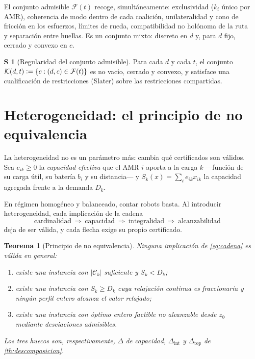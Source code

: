 \documentclass[11pt,a4paper]{article}
\theoremstyle{plain}
\newtheorem{teorema}{Teorema}[section]
\theoremstyle{definition}
\newtheorem{supuesto}{S}
\theoremstyle{remark}
\newcommand{\Fcal}{\mathcal{F}}
\newcommand{\Ccal}{\mathcal{C}}
\newcommand{\Kcal}{\mathcal{K}}
\newcommand{\defeq}{\vcentcolon=}
\begin{document}
El conjunto admisible $\Fcal(t)$ recoge, simultáneamente: exclusividad
($k_i$ único por AMR), coherencia de modo dentro de cada coalición,
unilateralidad y cono de fricción en los esfuerzos, límites de rueda,
compatibilidad no holónoma de la ruta y separación entre huellas. Es un
conjunto mixto: discreto en $d$ y, para $d$ fijo, cerrado y convexo en $c$.

\begin{supuesto}[Regularidad del conjunto admisible]
\label{s:admisible}
Para cada $d$ y cada $t$, el conjunto $\Kcal(d,t)\defeq\{c:(d,c)\in\Fcal(t)\}$
es no vacío, cerrado y convexo, y satisface una cualificación de restricciones
(Slater) sobre las restricciones compartidas.
\end{supuesto}






\section{Heterogeneidad: el principio de no equivalencia}
\label{sec:heterogeneidad}

La heterogeneidad no es un parámetro más: cambia qué certificados son válidos.
Sea $e_{ik}\ge0$ la \emph{capacidad efectiva} que el AMR $i$ aporta a la carga
$k$ —función de su carga útil, su batería $b_i$ y su distancia— y
$S_k(x)=\sum_i e_{ik}x_{ik}$ la capacidad agregada frente a la demanda $D_k$.

En régimen homogéneo y balanceado, contar robots basta. Al introducir
heterogeneidad, cada implicación de la cadena
\begin{equation}
  \text{cardinalidad}\ \Rightarrow\ \text{capacidad}\ \Rightarrow\
  \text{integralidad}\ \Rightarrow\ \text{alcanzabilidad}
  \label{eq:cadena}
\end{equation}
deja de ser válida, y cada flecha exige su propio certificado.

\begin{teorema}[Principio de no equivalencia]
\label{th:noequiv}
Ninguna implicación de \eqref{eq:cadena} es válida en general:
\begin{enumerate}[label=(\alph*),leftmargin=2.2em,topsep=0.2em,itemsep=0.15em]
  \item existe una instancia con $|\Ccal_k|$ suficiente y $S_k<D_k$;
  \item existe una instancia con $S_k\ge D_k$ cuya relajación continua es
        fraccionaria y ningún perfil entero alcanza el valor relajado;
  \item existe una instancia con óptimo entero factible no alcanzable desde
        $z_0$ mediante desviaciones admisibles.
\end{enumerate}
Los tres huecos son, respectivamente, $\Delta$ de capacidad,
$\Delta_{\mathrm{int}}$ y $\Delta_{\mathrm{top}}$ de
\cref{th:descomposicion}.
\end{teorema}
\end{document}
